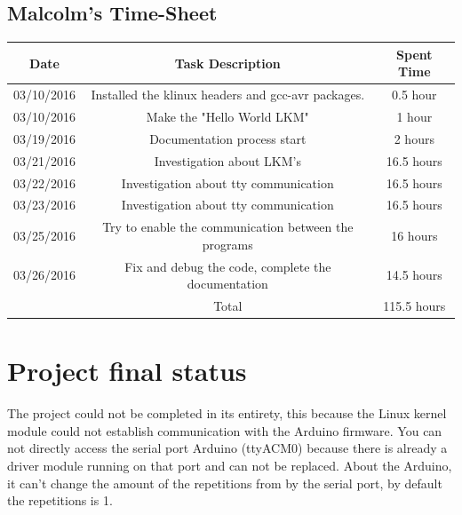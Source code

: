 \documentclass[12pt]{article}
\begin{document}
\subsection{Malcolm's Time-Sheet} 
\begin{center}
\begin{tabular}{ |c|c|c|} 
 \hline
 Date &  Task Description &  Spent Time \\ 
 \hline\hline 
 03/10/2016 & Installed the klinux headers and gcc-avr packages.& 0.5 hour\\
 03/10/2016 & Make the "Hello World LKM" & 1 hour \\
 03/19/2016 & Documentation process start & 2 hours\\ 
   03/21/2016 &Investigation about LKM's&16.5 hours \\
   03/22/2016 &Investigation about tty communication& 16.5 hours \\
   03/23/2016 &Investigation about tty communication& 16.5 hours \\
   03/25/2016 &Try to enable the communication between the programs&16 hours \\
   03/26/2016 &Fix and debug the code, complete the documentation&14.5 hours \\
  \hline
 & Total & 115.5 hours\\ 
 \hline
\end{tabular}
\end{center}

\section{Project final status}
The project could not be completed in its entirety, this because the Linux kernel module could not establish communication with the Arduino firmware. You can not directly access the serial port Arduino (ttyACM0) because there is already a driver module running on that port and can not be replaced.
About the Arduino, it can't change the amount of the repetitions from by the serial port, by default the repetitions is 1.
\end{document}
